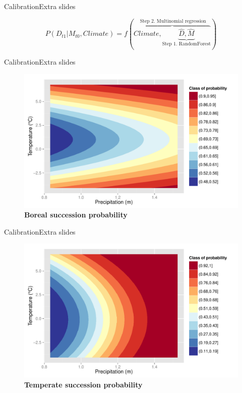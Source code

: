 \documentclass[10pt,aspectratio=149]{beamer}
\begin{document}






\begin{frame}{Calibration}{Extra slides}

	\begin{equation}
		P(D_{t1}|M_{t0}, Climate) = f(\overbrace{Climate, \underbrace{\hat{D}, \hat{M}}_\text{Step 1. RandomForest}}^\text{ Step 2. Multinomial regression})
	\label{eq1}
	\end{equation}

\end{frame}

\begin{frame}{Calibration}{Extra slides}

            \begin{figure}
              \caption*{\small \textbf{Boreal succession probability}}	
	          \includegraphics[width=0.8\linewidth]{Figs/alphab.pdf}
	        \end{figure}

\end{frame}

\begin{frame}{Calibration}{Extra slides}

            \begin{figure}
              \caption*{\small \textbf{Temperate succession probability}}	
	          \includegraphics[width=0.8\linewidth]{Figs/alphat.pdf}
	        \end{figure}

\end{frame}
\end{document}
